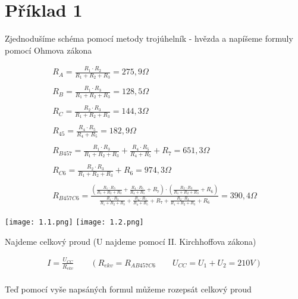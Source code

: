 \section{Příklad 1}

\begin{center}
	{Zjednodušíme schéma pomocí metody trojúhelník - hvězda a napíšeme formuly pomocí Ohmova zákona}
\end{center}

\begin{align*}
	R_A = \frac {R_1 \cdot R_2}{R_1 + R_2 + R_3} = 275,9 \Omega \\
	\\
	R_B = \frac {R_1 \cdot R_3}{R_1 + R_2 + R_3} = 128,5 \Omega \\
	\\
	R_C = \frac {R_2 \cdot R_3}{R_1 + R_2 + R_3} = 144,3 \Omega \\
	\\
	R_{45} = \frac {R_4 \cdot R_5}{R_4 + R_5} = 182,9 \Omega \\
	\\ 
	R_{B457} = \frac {R_1 \cdot R_3}{R_1 + R_2 + R_3} + \frac {R_4 \cdot R_5}{R_4 + R_5} +R_7 = 651,3 \Omega \\
	\\
	R_{C6} = \frac {R_2 \cdot R_3}{R_1 + R_2 + R_3} + R_6 = 974,3 \Omega \\
	\\
	R_{B457C6} =
	\frac
	{( \frac {R_1 \cdot R_3}{R_1 + R_2 + R_3} + \frac {R_4 \cdot R_5}{R_4 + R_5} +R_7) \cdot (\frac {R_2 \cdot R_3}{R_1 + R_2 + R_3} + R_6)}
	{\frac {R_1 \cdot R_3}{R_1 + R_2 + R_3} + \frac {R_4 \cdot R_5}{R_4 + R_5} +R_7 + \frac {R_2 \cdot R_3}{R_1 + R_2 + R_3} + R_6} = 390,4 \Omega 
\end{align*}

\texttt{[image: 1.1.png]}
\texttt{[image: 1.2.png]}

\begin{center}
	{Najdeme celkový proud (U najdeme pomocí II. Kirchhoffova zákona)}
\end{center}

\begin{align*}
	 I = \frac {U_{CC}}{R_{ekv}}\qquad
	( R_{ekv} = R_{AB457C6}\qquad U_{CC} = U_1 + U_2 = 210 V) \\
\end{align*}

\begin{center}
	{Teď pomocí vyše napsáných formul můžeme rozepsát celkový proud}
\end{center}

